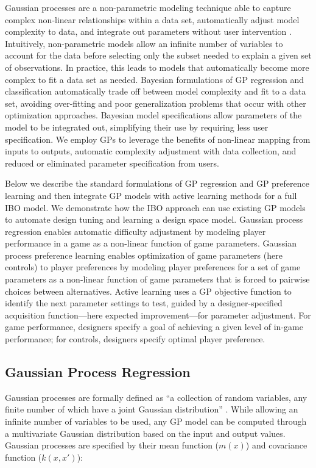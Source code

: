 \documentclass[letterpaper]{article}
\begin{document}
Gaussian processes are a non-parametric modeling technique able to capture complex non-linear relationships within a data set, automatically adjust model complexity to data, and integrate out parameters without user intervention \cite{rasmussen2006}. Intuitively, non-parametric models allow an infinite number of variables to account for the data before selecting only the subset needed to explain a given set of observations. In practice, this leads to models that automatically become more complex to fit a data set as needed. 
Bayesian formulations of GP regression and classification automatically trade off between model complexity and fit to a data set, avoiding over-fitting and poor generalization problems that occur with other optimization approaches. Bayesian model specifications allow parameters of the model to be integrated out, simplifying their use by requiring less user specification. We employ GPs to leverage the benefits of non-linear mapping from inputs to outputs, automatic complexity adjustment with data collection, and reduced or eliminated parameter specification from users.

Below we describe the standard formulations of GP regression and GP preference learning and then integrate GP models with active learning methods for a full IBO model. We demonstrate how the IBO approach can use existing GP models to automate design tuning and learning a design space model.
Gaussian process regression enables automatic difficulty adjustment by modeling player performance in a game as a non-linear function of game parameters. Gaussian process preference learning enables optimization of game parameters (here controls) to player preferences by modeling player preferences for a set of game parameters as a non-linear function of game parameters that is forced to pairwise choices between alternatives. Active learning uses a GP objective function to identify the next parameter settings to test, guided by a designer-specified acquisition function---here expected improvement---for parameter adjustment. For game performance, designers specify a goal of achieving a given level of in-game performance; for controls, designers specify optimal player preference.

\subsection{Gaussian Process Regression}
Gaussian processes are formally defined as ``a collection of random variables, any finite number of which have a joint Gaussian distribution'' \cite{rasmussen2006}. While allowing an infinite number of variables to be used, any GP model can be computed through a multivariate Gaussian distribution based on the input and output values. Gaussian processes are specified by their mean function ($m(x)$) and covariance function ($k(x,x')$):
\end{document}
